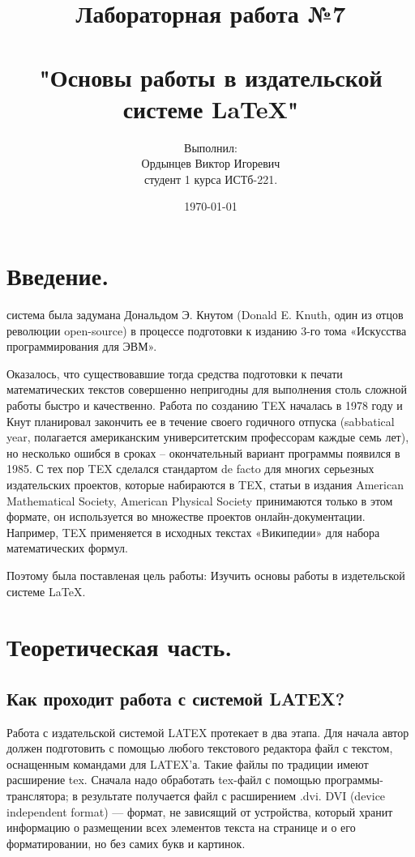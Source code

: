 \documentclass[a4peper,12pt]{report}
\title{Лабораторная работа №7\\ \\"Основы работы в издательской системе LaTeX"}
\author{Выполнил:\\Ордынцев Виктор Игоревич\\студент 1 курса ИСТб-221.}
\date{\today}
\begin{document}
\maketitle
\chapter{Введение.}

 система была задумана Дональдом Э. Кнутом (Donald E. Knuth, один из отцов революции open-source) в процессе подготовки к изданию 3-го тома «Искусства программирования для ЭВМ».

Оказалось, что существовавшие тогда средства подготовки к печати математических текстов совершенно непригодны для выполнения столь сложной работы быстро и качественно. Работа по созданию TEX началась в 1978 году и Кнут планировал закончить ее в течение своего годичного отпуска (sabbatical year, полагается американским университетским профессорам каждые семь лет), но несколько ошибся в сроках – окончательный вариант программы появился в 1985. С тех пор TEX сделался стандартом de facto для многих серьезных издательских проектов, которые набираются в TEX, статьи в издания American Mathematical Society, American Physical Society принимаются только в этом формате, он используется во множестве проектов онлайн-документации. Например, TEX применяется в исходных текстах «Википедии» для набора математических формул.

Поэтому была поставленая цель работы: Изучить основы работы в издетельской системе LaTeX.

\chapter{Теоретическая часть.}
\section{Как проходит работа с системой LATEX?}

Работа с издательской системой LATEX протекает в два этапа. Для начала автор должен подготовить с помощью любого текстового редактора файл с текстом, оснащенным командами для LATEX’а. Такие файлы по традиции имеют расширение tex. Сначала надо обработать tex-файл с помощью программы-транслятора; в результате получается файл с расширением .dvi. DVI (device independent format) — формат, не зависящий от устройства, который хранит информацию о размещении всех элементов текста на странице и о его форматировании, но без самих букв и картинок. 
\end{document}
